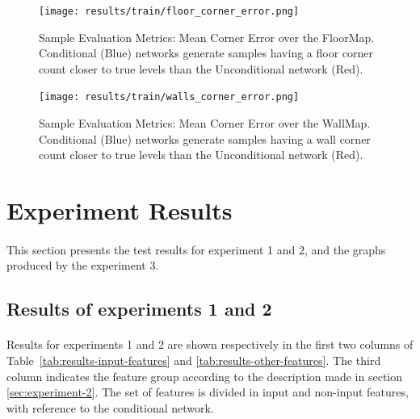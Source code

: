 \begin{figure}[!htb] 
	\begin{minipage}[b]{0.9\linewidth}
		\centering
		\texttt{[image: results/train/floor\_corner\_error.png]} 
		\caption[Sample Evaluation Metrics: Mean Corner Error (FloorMap)]{Sample Evaluation Metrics: Mean Corner Error over the FloorMap. Conditional (Blue) networks generate samples having a floor corner count closer to true levels than the Unconditional network (Red).}
		\label{fig:floor_corner_error}
	\end{minipage}

	\begin{minipage}[b]{0.9\linewidth}
		\centering
		\texttt{[image: results/train/walls\_corner\_error.png]} 
		\caption[Sample Evaluation Metrics: Mean Corner Error (WallMap)]{Sample Evaluation Metrics: Mean Corner Error over the WallMap. Conditional (Blue) networks generate samples having a wall corner count closer to true levels than the Unconditional network (Red).}
		\label{fig:wall_corner_error}
	\end{minipage}
\end{figure}


\FloatBarrier
\section{Experiment Results}
\label{sec:results-experiments}
\paragraph{} This section presents the test results for experiment 1 and 2, and the graphs produced by the experiment 3.
\subsection{Results of experiments 1 and 2}
\paragraph{} Results for experiments 1 and 2 are shown respectively in the first two columns of Table~\ref{tab:results-input-features} and \ref{tab:results-other-features}. The third column indicates the feature group according to the description made in section \ref{sec:experiment-2}. The set of features is divided in input and non-input features, with reference to the conditional network.
	
